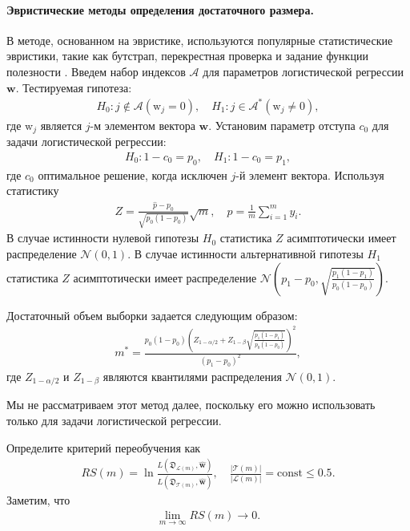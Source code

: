 \paragraph{Эвристические методы определения достаточного размера.}
В методе, основанном на эвристике, используются популярные статистические эвристики, такие как бутстрап, перекрестная проверка и задание функции полезности .
Введем набор индексов $\mathcal {A} $ для параметров логистической регрессии $\textbf {w} $. Тестируемая гипотеза:
\[
\label{eq:hb:1}
\begin{aligned}
	H_0: j \not\in\mathcal{A} \left(\text{w}_{j} = 0\right), \quad H_1: j \in \mathcal{A}^* \left(\text{w}_{j} \not= 0\right),
\end{aligned}
\]
где $\text{w}_{j}$ является $j$-м элементом вектора $\textbf{w}$.
Установим параметр отступа $ c_0 $ для задачи логистической регрессии:
\[
\label{eq:hb:2}
\begin{aligned}
	H_0: 1-c_0 = p_0, \quad H_1: 1-c_0 = p_1,
\end{aligned}
\]
где $c_0$ оптимальное решение, когда исключен $j$-й элемент вектора.
Используя статистику
\[
\label{eq:hb:3}
\begin{aligned}
	Z = \frac{\hat{p}-p_0}{\sqrt{p_0(1-p_0)}}\sqrt{m}, \quad \hat{p} = \frac{1}{m}\sum_{i=1}^{m}y_i.
\end{aligned}
\]
В случае истинности нулевой гипотезы $H_0$ статистика $Z$ асимптотически имеет распределение $\mathcal{N}\left(0, 1\right)$. В случае истинности альтернативной гипотезы $H_1$ статистика $Z$  асимптотически имеет распределение $ \mathcal{N}\left(p_1-p_0, \sqrt{\frac{p_1(1-p_1)}{p_0(1-p_0)}}\right)$.
      
Достаточный объем выборки задается следующим образом:
\[
\label{eq:hb:4}
\begin{aligned}
	m^* = \frac{p_0(1-p_0)\left(Z_{1-\alpha/2} + Z_{1-\beta}\sqrt{\frac{p_1(1-p_1)}{p_0(1-p_0)}}\right)^2}{(p_1-p_0)^2},
\end{aligned}
\]
где $Z_{1-\alpha/2}$ и $Z_{1-\beta}$ являются квантилями распределения $\mathcal{N}\left(0, 1\right)$.
    
Мы не рассматриваем этот метод далее, поскольку его можно использовать только для задачи логистической регрессии.
    
Определите критерий переобучения как
\[
\label{eq:hb:5}
\begin{aligned}
	RS(m) = \ln\frac{L(\mathfrak{D}_{\mathcal{L}(m)}, \hat{\textbf{w}})}{L(\mathfrak{D}_{\mathcal{T}(m)}, \hat{\textbf{w}})}, \quad \frac{|\mathcal{T}(m)|}{|\mathcal{L}(m)|} = \text{const} \leq 0.5.
\end{aligned}
\]
Заметим, что
\[
\label{eq:hb:6}
\begin{aligned}
	\lim_{m\to \infty}RS(m) \to 0.
\end{aligned}
\]


